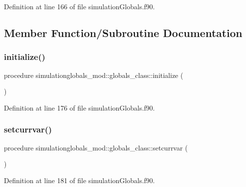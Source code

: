 Definition at line 166 of file simulation\+Globals.\+f90.



\subsection{Member Function/\+Subroutine Documentation}
\mbox{\label{structsimulationglobals__mod_1_1globals__class_a3b8fe335ee4571c73b774cbbe37820cf}} 
\subsubsection{\texorpdfstring{initialize()}{initialize()}}
{\footnotesize\ttfamily procedure simulationglobals\+\_\+mod\+::globals\+\_\+class\+::initialize (\begin{DoxyParamCaption}{ }\end{DoxyParamCaption})\hspace{0.3cm}{\ttfamily [private]}}



Definition at line 176 of file simulation\+Globals.\+f90.

\mbox{\label{structsimulationglobals__mod_1_1globals__class_ae1d8dcce038856889fec915c28a054ce}} 
\subsubsection{\texorpdfstring{setcurrvar()}{setcurrvar()}}
{\footnotesize\ttfamily procedure simulationglobals\+\_\+mod\+::globals\+\_\+class\+::setcurrvar (\begin{DoxyParamCaption}{ }\end{DoxyParamCaption})\hspace{0.3cm}{\ttfamily [private]}}



Definition at line 181 of file simulation\+Globals.\+f90.

